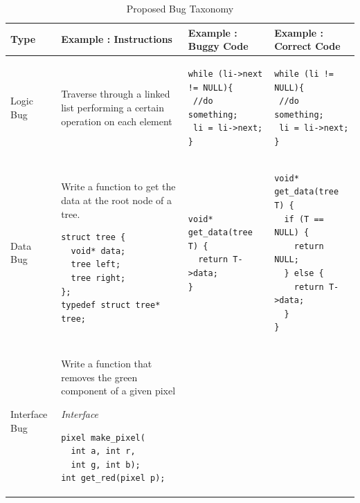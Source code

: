 \documentclass{sig-alternate}
\begin{document}
\begin{table}
\def\arraystretch{1.75}
\centering
\caption{Proposed Bug Taxonomy}
\label{table:new-taxonomy}
\begin{tabular}{|p{0.95in}|p{1.7in}|p{1.9in}|p{2.1in}|} \hline
Type&Example : Instructions&Example : Buggy Code&Example : Correct Code\\ \hline
\vspace{0.05in}
Logic Bug
&
\vspace{0.05in}
Traverse through a linked list performing a certain	operation on each element
&
\begin{verbatim}
while (li->next != NULL){
 //do something;
 li = li->next;
}
\end{verbatim}
&
\begin{verbatim}
while (li != NULL){
 //do something;
 li = li->next;
}
\end{verbatim}\\
\hline
\vspace{0.05in}
Data Bug
&
\vspace{0.05in}
Write a function to get the data at the root node of a tree.
\begin{verbatim}
struct tree {
  void* data;
  tree left;
  tree right;
};
typedef struct tree* tree;
\end{verbatim}
&
\begin{verbatim}
void* get_data(tree T) {
  return T->data;
}
\end{verbatim}
&
\begin{verbatim}
void* get_data(tree T) {
  if (T == NULL) {
    return NULL;
  } else {
    return T->data;
  }
}
\end{verbatim}\\
\hline
\vspace{0.05in}
Interface Bug &
\vspace{0.05in}
Write a function that removes the green component of a given pixel
\vspace{0.11in}

\emph{Interface}
\vspace{-0.11in}
\begin{verbatim}
pixel make_pixel(
  int a, int r,
  int g, int b);
int get_red(pixel p);
\end{verbatim}


\end{tabular}
\end{table}
\end{document}
